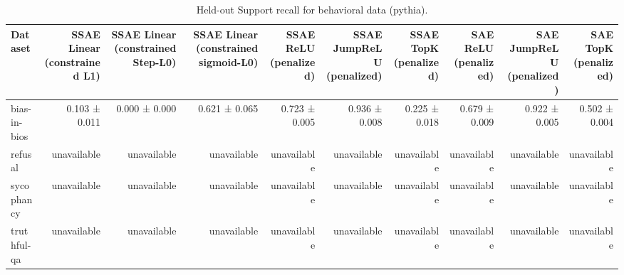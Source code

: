 \begin{table}[t]
\centering
\caption{Held-out Support recall for behavioral data (pythia).}
\label{tab:behavioral-pythia-support-recall}
\begin{tabular}{lrrrrrrrrr}
\toprule
Dataset & SSAE Linear (constrained L1) & SSAE Linear (constrained Step-L0) & SSAE Linear (constrained sigmoid-L0) & SSAE ReLU (penalized) & SSAE JumpReLU (penalized) & SSAE TopK (penalized) & SAE ReLU (penalized) & SAE JumpReLU (penalized) & SAE TopK (penalized) \\
\midrule
bias-in-bios & 0.103 ± 0.011 & 0.000 ± 0.000 & 0.621 ± 0.065 & 0.723 ± 0.005 & 0.936 ± 0.008 & 0.225 ± 0.018 & 0.679 ± 0.009 & 0.922 ± 0.005 & 0.502 ± 0.004 \\
refusal & unavailable & unavailable & unavailable & unavailable & unavailable & unavailable & unavailable & unavailable & unavailable \\
sycophancy & unavailable & unavailable & unavailable & unavailable & unavailable & unavailable & unavailable & unavailable & unavailable \\
truthful-qa & unavailable & unavailable & unavailable & unavailable & unavailable & unavailable & unavailable & unavailable & unavailable \\
\bottomrule
\end{tabular}
\end{table}
